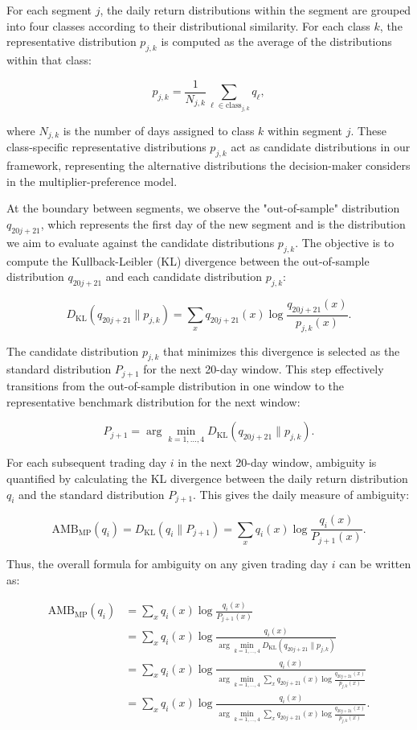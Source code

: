 \documentclass[preprint,12pt,authoryear]{elsarticle}
\begin{document}
For each segment \(j\), the daily return distributions within the segment are grouped into four classes according to their distributional similarity. For each class \(k\), the representative distribution \(p_{j,k}\) is computed as the average of the distributions within that class:

\[
p_{j,k} = \frac{1}{N_{j,k}} \sum_{\ell \in \text{class}_{j,k}} q_{\ell},
\]

where \(N_{j,k}\) is the number of days assigned to class \(k\) within segment \(j\). These class-specific representative distributions \(p_{j,k}\) act as candidate distributions in our framework, representing the alternative distributions the decision-maker considers in the multiplier-preference model.

At the boundary between segments, we observe the "out-of-sample" distribution \(q_{20j+21}\), which represents the first day of the new segment and is the distribution we aim to evaluate against the candidate distributions \(p_{j,k}\). The objective is to compute the Kullback-Leibler (KL) divergence between the out-of-sample distribution \(q_{20j+21}\) and each candidate distribution \(p_{j,k}\):

\[
D_{\mathrm{KL}}(q_{20j+21} \parallel p_{j,k}) = \sum_{x} q_{20j+21}(x) \log \frac{q_{20j+21}(x)}{p_{j,k}(x)}.
\]

The candidate distribution \(p_{j,k}\) that minimizes this divergence is selected as the standard distribution \(P_{j+1}\) for the next 20-day window. This step effectively transitions from the out-of-sample distribution in one window to the representative benchmark distribution for the next window:

\[
P_{j+1} = \arg\min_{k=1,\dots,4} D_{\mathrm{KL}}(q_{20j+21} \parallel p_{j,k}).
\]

For each subsequent trading day \(i\) in the next 20-day window, ambiguity is quantified by calculating the KL divergence between the daily return distribution \(q_i\) and the standard distribution \(P_{j+1}\). This gives the daily measure of ambiguity:

\[
\mathrm{AMB}_{\mathrm{MP}}(q_i) = D_{\mathrm{KL}}(q_i \parallel P_{j+1}) = \sum_{x} q_i(x) \log \frac{q_i(x)}{P_{j+1}(x)}.
\]

Thus, the overall formula for ambiguity on any given trading day \(i\) can be written as:

\[
\begin{aligned}
\mathrm{AMB}_{\mathrm{MP}}(q_i) &= \sum_{x} q_i(x) \log \frac{q_i(x)}{P_{j+1}(x)} \\
&= \sum_{x} q_i(x) \log \frac{q_i(x)}{\arg\min_{k=1,\dots,4} D_{\mathrm{KL}}(q_{20j+21} \parallel p_{j,k})} \\
&= \sum_{x} q_i(x) \log \frac{q_i(x)}{\arg\min_{k=1,\dots,4} \sum_{x} q_{20j+21}(x) \log \frac{q_{20j+21}(x)}{p_{j,k}(x)}} \\
&= \sum_{x} q_i(x) \log \frac{q_i(x)}{\arg\min_{k=1,\dots,4} \sum_{x} q_{20j+21}(x) \log \frac{q_{20j+21}(x)}{p_{j,k}(x)}}.
\end{aligned}
\]
\end{document}
